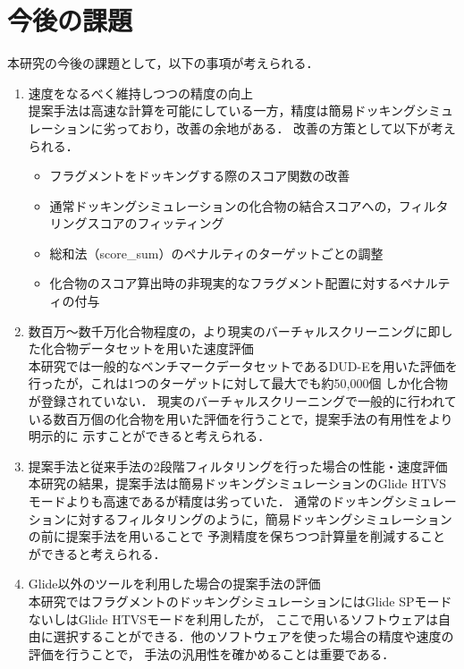 \newpage

\section{今後の課題}
本研究の今後の課題として，以下の事項が考えられる．
\begin{enumerate}
\item 速度をなるべく維持しつつの精度の向上\\
	提案手法は高速な計算を可能にしている一方，精度は簡易ドッキングシミュレーションに劣っており，改善の余地がある．
	改善の方策として以下が考えられる．
	\begin{itemize}
	\item フラグメントをドッキングする際のスコア関数の改善
	\item 通常ドッキングシミュレーションの化合物の結合スコアへの，フィルタリングスコアのフィッティング
	\item 総和法（score\_sum）のペナルティのターゲットごとの調整
	\item 化合物のスコア算出時の非現実的なフラグメント配置に対するペナルティの付与
	\end{itemize}
\item 数百万～数千万化合物程度の，より現実のバーチャルスクリーニングに即した化合物データセットを用いた速度評価\\
	本研究では一般的なベンチマークデータセットであるDUD-Eを用いた評価を行ったが，これは1つのターゲットに対して最大でも約50,000個
	しか化合物が登録されていない．
	現実のバーチャルスクリーニングで一般的に行われている数百万個の化合物を用いた評価を行うことで，提案手法の有用性をより明示的に
	示すことができると考えられる．
\item 提案手法と従来手法の2段階フィルタリングを行った場合の性能・速度評価\\
	本研究の結果，提案手法は簡易ドッキングシミュレーションのGlide HTVSモードよりも高速であるが精度は劣っていた．
	通常のドッキングシミュレーションに対するフィルタリングのように，簡易ドッキングシミュレーションの前に提案手法を用いることで
	予測精度を保ちつつ計算量を削減することができると考えられる．
\item Glide以外のツールを利用した場合の提案手法の評価\\
	本研究ではフラグメントのドッキングシミュレーションにはGlide SPモードないしはGlide HTVSモードを利用したが，
	ここで用いるソフトウェアは自由に選択することができる．他のソフトウェアを使った場合の精度や速度の評価を行うことで，
	手法の汎用性を確かめることは重要である．
\end{enumerate}
